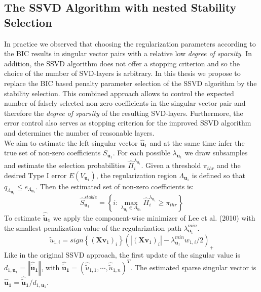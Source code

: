 \subsection{The SSVD Algorithm with nested Stability Selection}
In practice we observed that choosing the regularization parameters according to the BIC results in singular vector pairs with a relative low \textit{degree of sparsity}. In addition, the SSVD algorithm does not offer a stopping criterion and so the choice of the number of SVD-layers is arbitrary.
In this thesis we propose to replace the BIC based penalty parameter selection of the SSVD algorithm by the stability selection. 
This combined approach allows to control the expected number of falsely selected non-zero coefficients in the singular vector pair and therefore the \textit{degree of sparsity} of the resulting SVD-layers. Furthermore, the error control also serves as stopping criterion for the improved SSVD algorithm and determines the number of reasonable layers. \\
We aim to estimate the left singular vector $\mathbf{\hat{u}}_{1}$ and at the same time infer the true set of non-zero coefficients $S_{\mathbf{u}_{1}}$.
For each possible $\lambda_{\mathbf{u}_{1}}$ we draw subsamples and estimate the selection probabilities $\hat{\Pi}_{i}^{\lambda_{\mathbf{u}_{1}}}$.
Given a threshold $\pi_{thr}$ and the desired Type I error $E(V_{\mathbf{u}_{1}})$, the regularization region $\Lambda_{\mathbf{u}_{1}}$ is defined so that $q_{\Lambda_{\mathbf{u}_{1}}} \leq e_{\Lambda_{\mathbf{u}_{1}}}$.
Then the estimated set of non-zero coefficients is:\\
\begin{equation}
\hat{S}_{\mathbf{u}_{1}}^{stable}=\left\{i: \max_{\lambda_{\mathbf{u}_{1}} \in \Lambda_{\mathbf{u}_{1}}} \hat{\Pi}_{i}^{\lambda_{\mathbf{u}_{1}}} \geq \pi_{thr} \right\}
\end{equation}
To estimate $\mathbf{\hat{\tilde{u}}_{1}}$ we apply the component-wise minimizer of Lee et al. (2010) with the smallest penalization value of the regularization path $\lambda_{\mathbf{u}_{1}}^{min}$.
\begin{equation}
\hat{\tilde{u}}_{1,i}=\textit{sign} \left\{(\mathbf{X}\mathbf{v}_{1})_{i} \right\} (|(\mathbf{X}\mathbf{v}_{1})_{i}|- \lambda^{min}_{\mathbf{u}_{1}}w_{1,i}/2)_{+} 
\end{equation}
Like in the original SSVD approach, the first update of the singular value is $d_{1,\mathbf{u}_{1}}=\left\Vert\mathbf{\hat{\tilde{u}}_{1}}\right\Vert$, with 
$\mathbf{\hat{\tilde{u}}_{1}}=(\hat{\tilde{u}}_{1,1},\cdots,\hat{\tilde{u}}_{1,n})^{T}$. The estimated sparse singular vector is  $\mathbf{\hat{u}_{1}}=\mathbf{\hat{\tilde{u}}_{1}}/d_{1,\mathbf{u}_{1}}$.
